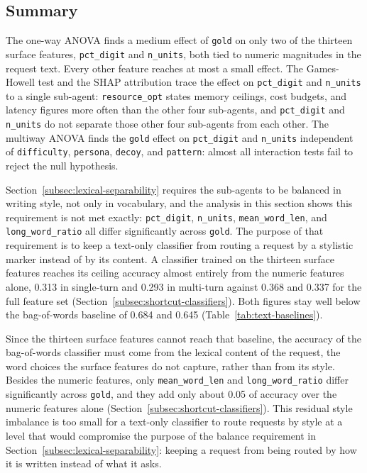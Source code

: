 \subsection{Summary}
\label{subsec:anova-summary}

The one-way ANOVA finds a medium effect of \texttt{gold} on only two of the thirteen surface features, \texttt{pct\_digit} and \texttt{n\_units}, both tied to numeric magnitudes in the request text. Every other feature reaches at most a small effect. The Games-Howell test and the SHAP attribution trace the effect on \texttt{pct\_digit} and \texttt{n\_units} to a single sub-agent: \texttt{resource\_opt} states memory ceilings, cost budgets, and latency figures more often than the other four sub-agents, and \texttt{pct\_digit} and \texttt{n\_units} do not separate those other four sub-agents from each other. The multiway ANOVA finds the \texttt{gold} effect on \texttt{pct\_digit} and \texttt{n\_units} independent of \texttt{difficulty}, \texttt{persona}, \texttt{decoy}, and \texttt{pattern}: almost all interaction tests fail to reject the null hypothesis.

Section~\ref{subsec:lexical-separability} requires the sub-agents to be balanced in writing style, not only in vocabulary, and the analysis in this section shows this requirement is not met exactly: \texttt{pct\_digit}, \texttt{n\_units}, \texttt{mean\_word\_len}, and \texttt{long\_word\_ratio} all differ significantly across \texttt{gold}. The purpose of that requirement is to keep a text-only classifier from routing a request by a stylistic marker instead of by its content. A classifier trained on the thirteen surface features reaches its ceiling accuracy almost entirely from the numeric features alone, 0.313 in single-turn and 0.293 in multi-turn against 0.368 and 0.337 for the full feature set (Section~\ref{subsec:shortcut-classifiers}). Both figures stay well below the bag-of-words baseline of 0.684 and 0.645 (Table~\ref{tab:text-baselines}).

Since the thirteen surface features cannot reach that baseline, the accuracy of the bag-of-words classifier must come from the lexical content of the request, the word choices the surface features do not capture, rather than from its style. Besides the numeric features, only \texttt{mean\_word\_len} and \texttt{long\_word\_ratio} differ significantly across \texttt{gold}, and they add only about 0.05 of accuracy over the numeric features alone (Section~\ref{subsec:shortcut-classifiers}). This residual style imbalance is too small for a text-only classifier to route requests by style at a level that would compromise the purpose of the balance requirement in Section~\ref{subsec:lexical-separability}: keeping a request from being routed by how it is written instead of what it asks.

